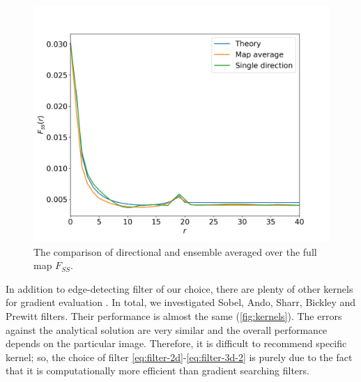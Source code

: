 \documentclass[reprint,amsmath,amssymb,aps,pre,showkeys,showpacs]{revtex4-1}
\begin{document}
\begin{figure}[ht]
  \centering
  \includegraphics[width=\linewidth]{images/direction_and_map.png}
  \caption{The comparison of directional and ensemble averaged over the full map
    $F_{SS}$.}
  \label{fig:direction-vs-map}
\end{figure}

In addition to edge-detecting filter of our choice, there are plenty of other
kernels for gradient evaluation \cite{bickley1948,prewitt1970,ando2000}. In
total, we investigated Sobel, Ando, Sharr, Bickley and Prewitt filters. Their
performance is almost the same (\cref{fig:kernels}). The errors against the
analytical solution are very similar and the overall performance depends on the
particular image. Therefore, it is difficult to recommend specific kernel; so,
the choice of filter \cref{eq:filter-2d}-\cref{eq:filter-3d-2} is purely due to
the fact that it is computationally more efficient than gradient searching
filters.
\end{document}

